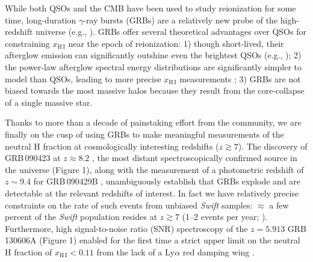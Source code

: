 \documentclass[letterpaper,11pt]{article}
\begin{document}
While both QSOs and the CMB have been used to study reionization for some time, 
long-duration $\gamma$-ray bursts (GRBs) are a relatively new probe of the high-redshift 
universe (e.g., \cite{lr00}).  GRBs offer several theoretical advantages over QSOs
for constraining $x_{\mathrm{H\,I}}$ near the epoch of reionization: 1) though
short-lived, their afterglow emission can significantly outshine even the brightest
QSOs (e.g., \cite{rks+08,bpl+09,kmk07}); 2) the power-law afterglow spectral energy 
distributions are significantly simpler to model than QSOs, leading to more precise 
$x_{\mathrm{H\,I}}$ measurements \cite{mlz+08}; 3) GRBs are not biased towards 
the most massive halos\cite{mlz+08} because they result from the 
core-collapse of a single massive star.

Thanks to more than a decade of painstaking effort from the community, we are finally
on the cusp of using GRBs to make meaningful measurements of the neutral H fraction 
at cosmologically interesting redshifts ($z \gtrsim 7$).  The discovery of 
GRB\,090423 at $z \approx 8.2$ \cite{tfl+09,sdc+09}, the most distant 
spectroscopically confirmed source in the universe (Figure 1), along with the 
measurement of a photometric redshift of $z \sim 9.4$ for GRB\,090429B \cite{clf+11}, 
unambiguously establish that GRBs explode and are detectable at the relevant redshifts 
of interest.  In fact we have relatively precise constraints on the rate of such events from 
unbiased \textit{Swift} samples: $\approx$ a few percent of the \textit{Swift} population 
resides at $z \gtrsim 7$ (1--2 events per year; \cite{pcb+09,gkk+11}).  Furthermore, 
high signal-to-noise ratio (SNR) spectroscopy of the $z = 5.913$ GRB\,130606A (Figure 1) 
enabled for the first time a strict upper limit on the neutral H fraction of $x_{\mathrm{H\,I}} < 0.11$ 
from the lack of a Ly$\alpha$ red damping wing \cite{cbf+13}.
\end{document}
